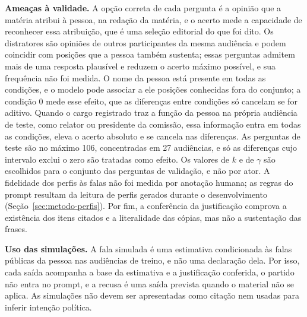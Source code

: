 \textbf{Ameaças à validade.} A opção correta de cada pergunta é a opinião que a matéria atribui à
pessoa, na redação da matéria, e o acerto mede a capacidade de reconhecer essa atribuição, que é uma
seleção editorial do que foi dito. Os distratores são opiniões de outros participantes da mesma
audiência e podem coincidir com posições que a pessoa também sustenta; essas perguntas admitem mais
de uma resposta plausível e reduzem o acerto máximo possível, e sua frequência não foi medida. O nome
da pessoa está presente em todas as condições, e o modelo pode associar a ele posições conhecidas
fora do conjunto; a condição 0 mede esse efeito, que as diferenças entre condições só cancelam se
for aditivo. Quando o cargo registrado traz a função da pessoa na própria audiência de teste, como
relator ou presidente da comissão, essa informação entra em todas as condições, eleva o acerto
absoluto e se cancela nas diferenças. As perguntas de teste são no máximo 106, concentradas em 27
audiências, e só as diferenças cujo intervalo exclui o zero são tratadas como efeito. Os valores de
$k$ e de $\gamma$ são escolhidos para o conjunto das perguntas de validação, e não por ator. A
fidelidade dos perfis às falas não foi medida por anotação humana; as regras do prompt resultam da
leitura de perfis gerados durante o desenvolvimento (Seção~\ref{sec:metodo-perfis}). Por fim, a
conferência da justificação comprova a existência dos itens citados e a literalidade das cópias, mas
não a sustentação das frases.

\textbf{Uso das simulações.} A fala simulada é uma estimativa condicionada às falas públicas da
pessoa nas audiências de treino, e não uma declaração dela. Por isso, cada saída acompanha a base da
estimativa e a justificação conferida, o partido não entra no prompt, e a recusa é uma saída prevista
quando o material não se aplica. As simulações não devem ser apresentadas como citação nem usadas
para inferir intenção política.
